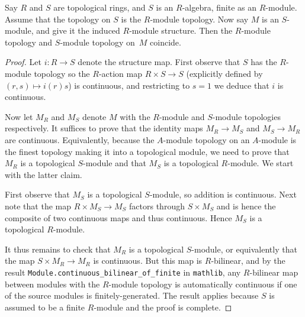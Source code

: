 \begin{lemma}
  \label{IsModuleTopology.Module.continuous_bilinear_of_finite}
  \leanok
  Say $R$ and $S$ are topological rings, and $S$ is an $R$-algebra, finite as an $R$-module.
  Assume that the topology
  on $S$ is the $R$-module topology. Now say $M$ is an $S$-module, and give it the induced
  $R$-module structure. Then the $R$-module topology and $S$-module topology on~$M$ coincide.
\end{lemma}
\begin{proof}
  \leanok
  Let $i:R\to S$ denote the structure map. First observe that $S$ has the $R$-module topology
  so the $R$-action map $R\times S\to S$ (explicitly defined by $(r,s)\mapsto i(r)s$)
  is continuous, and restricting to $s=1$ we deduce that $i$ is continuous.

  Now let $M_R$ and $M_S$ denote $M$ with the $R$-module and $S$-module topologies respectively.
  It suffices to prove that the identity maps $M_R\to M_S$ and $M_S\to M_R$ are continuous.
  Equivalently, because the $A$-module topology on an $A$-module is the finest topology
  making it into a topological module, we need to prove that $M_R$ is a topological $S$-module
  and that $M_S$ is a topological $R$-module. We start with the latter claim.

  First observe that $M_S$ is a topological $S$-module, so addition is continuous.
  Next note that the map $R\times M_S\to M_S$ factors through $S\times M_S$ and is hence the
  composite of two continuous maps and thus continuous. Hence $M_S$ is a topological $R$-module.

  It thus remains to check that $M_R$ is a topological $S$-module, or equivalently
  that the map $S\times M_R\to M_R$ is continuous. But this map is $R$-bilinear, and
  by the result {\tt Module.continuous\_bilinear\_of\_finite} in {\tt mathlib}, any
  $R$-bilinear map between modules with the $R$-module topology is automatically continuous
  if one of the source modules is finitely-generated. The result applies because $S$ is
  assumed to be a finite $R$-module and the proof is complete.
\end{proof}

